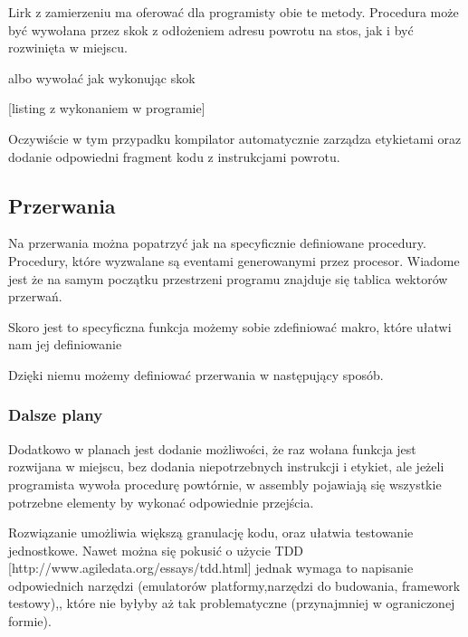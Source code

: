 \documentclass[11pt]{article}
\begin{document}
Lirk z zamierzeniu ma oferować dla programisty obie te metody. Procedura może być wywołana przez skok z odłożeniem adresu powrotu na stos, jak i być rozwinięta w miejscu.
\newpage

\begin{multicols}{2}

\columnbreak

\end{multicols}

albo wywołać jak wykonując skok

[listing z wykonaniem w programie]
\begin{multicols}{2}

\columnbreak

\end{multicols}

Oczywiście w tym przypadku kompilator automatycznie zarządza etykietami oraz dodanie odpowiedni fragment kodu z instrukcjami powrotu.

\subsection{Przerwania}

Na przerwania można popatrzyć jak na specyficznie definiowane procedury. Procedury,  które wyzwalane są eventami generowanymi przez procesor. Wiadome jest że na samym początku przestrzeni programu znajduje się tablica wektorów przerwań.

Skoro jest to specyficzna funkcja możemy sobie zdefiniować makro,  które ułatwi nam jej definiowanie




Dzięki niemu możemy definiować przerwania w następujący sposób.



\subsubsection{Dalsze plany}

Dodatkowo w planach jest dodanie możliwości, że raz wołana funkcja jest rozwijana w miejscu, bez dodania niepotrzebnych instrukcji i etykiet, ale jeżeli programista wywoła procedurę powtórnie, w assembly pojawiają się wszystkie potrzebne elementy by wykonać odpowiednie przejścia.

Rozwiązanie umożliwia większą granulację kodu, oraz ułatwia testowanie jednostkowe. Nawet można się pokusić o użycie TDD [http://www.agiledata.org/essays/tdd.html] jednak wymaga to napisanie odpowiednich narzędzi (emulatorów platformy,narzędzi do budowania, framework testowy),,  które nie byłyby aż tak problematyczne (przynajmniej w ograniczonej formie).
\end{document}
